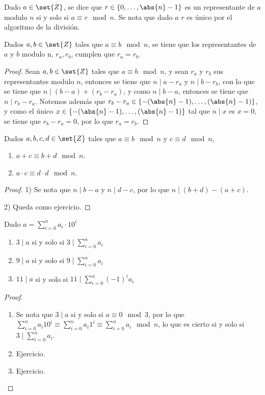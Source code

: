 \documentclass{ayudantia}
\begin{document}
\begin{defn}
    Dado \(a\in\set{Z}\), se dice que \(r\in\{0,\dots,\abs{n}-1\}\) es un representante de \(a\) modulo \(n\) si y solo si \(a\equiv r\mod n\). Se nota que dado \(a\) \(r\) es único por el algoritmo de la división.
\end{defn}

\begin{lem}
    Dados \(a,b\in\set{Z}\) tales que \(a\equiv b\mod n\), se tiene que los representantes de \(a\) y \(b\) modulo n, \(r_a,r_b\), cumplen que \(r_a=r_b\).
\end{lem}
\begin{proof}
    Sean \(a,b\in\set{Z}\) tales que \(a\equiv b\mod n\), y sean \(r_a\) y \(r_b\) sus representantes modulo \(n\), entonces se tiene que \(n\mid a-r_a\) y \(n\mid b-r_b\), con lo que se tiene que \(n\mid (b-a)+(r_b-r_a)\), y como \(n\mid b-a\), entonces se tiene que \(n\mid r_b-r_a\). Notemos además que \(r_b-r_a\in\{-(\abs{n}-1),\dots,(\abs{n}-1)\}\), y como el único \(x\in\{-(\abs{n}-1),\dots,(\abs{n}-1)\}\) tal que \(n\mid x\) es \(x=0\), se tiene que \(r_b-r_a=0\), por lo que \(r_a=r_b\).
\end{proof}

\begin{thm}
    Dados \(a,b,c,d\in\set{Z}\) tales que \(a\equiv b\mod n\) y \(c\equiv d\mod n\), 
    \begin{enumerate}
        \item \(a+c\equiv b+d\mod n\).
        \item \(a\cdot c\equiv d\cdot d\mod n\).
    \end{enumerate}
\end{thm}

\begin{proof}
    1) Se nota que \(n\mid b-a\) y \(n\mid d-c\), por lo que \(n\mid (b+d)-(a+c)\).

    2) Queda como ejercicio.
\end{proof}

\begin{thm}
    Dado \(a=\sum_{i=0}^na_i\cdot 10^i\)
    \begin{enumerate}
        \item \(3\mid a\) si y solo si \(3\mid\sum_{i=0}^na_i\)
        \item \(9\mid a\) si y solo si \(9\mid\sum_{i=0}^na_i\)
        \item \(11\mid a\) si y solo si \(11\mid\sum_{i=0}^n(-1)^ia_i\)
    \end{enumerate}
\end{thm}

\begin{proof}
    \begin{enumerate}
        \item Se nota que \(3\mid a\) si y solo si \(a\equiv 0\mod 3\), por lo que \(\sum_{i=0}^na_i10^i\equiv\sum_{i=0}^na_i1^i\equiv\sum_{i=0}^na_i\mod n\), lo que es cierto si y solo si \(3\mid\sum_{i=0}^na_i\).
        \item Ejercicio.
        \item Ejercicio.
    \end{enumerate}
\end{proof}
\end{document}

